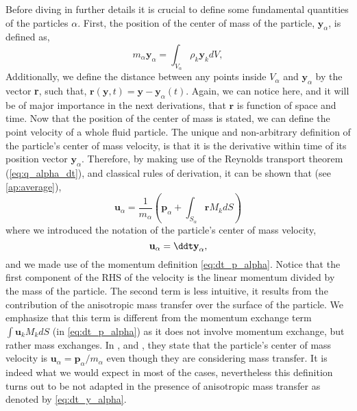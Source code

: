 Before diving in further details it is crucial to define some fundamental quantities of the particles $\alpha$. 
First, the position of the center of mass of the particle, $\textbf{y}_\alpha$, is defined as, 
\begin{equation*}
    m_\alpha \textbf{y}_\alpha
    = \int_{V_\alpha} \rho_k \textbf{y}_k dV,
\end{equation*}
Additionally, we define the distance between any points inside $V_\alpha$ and $\textbf{y}_\alpha$ by the vector \textbf{r}, such that, $\textbf{r}(\textbf{y},t) = \textbf{y} - \textbf{y}_\alpha(t)$.
Again, we can notice here, and it will be of major importance in the next derivations, that $\textbf{r}$ is function of space and time. 
Now that the position of the center of mass is stated, we can define the point velocity of a whole fluid particle.
The unique and non-arbitrary definition of the particle's center of mass velocity, is that it is the derivative within time of its position vector $\textbf{y}_\alpha$.
Therefore, by making use of the Reynolds transport theorem (\ref{eq:q_alpha_dt}), and classical rules of derivation, it can be shown that (see \ref{ap:average}),  
\begin{equation}
    \textbf{u}_\alpha
    = \frac{1}{m_\alpha} \left(
        \textbf{p}_\alpha
        +  \int_{S_\alpha} \textbf{r} M_k dS
    \right)
    \label{eq:dt_y_alpha}
\end{equation}
where we introduced the notation of the particle's center of mass velocity, 
\begin{equation*}
    \textbf{u}_\alpha = \ddt \textbf{y}_\alpha,
\end{equation*}
and we made use of the momentum definition \ref{eq:dt_p_alpha}.
Notice that the first component of the RHS of the velocity is the linear momentum divided by the mass of the particle.
The second term is less intuitive, it results from the contribution of the anisotropic mass transfer over the surface of the particle. 
We emphasize that this term is different from the momentum exchange term $\int \textbf{u}_kM_k dS$ (in \ref{eq:dt_p_alpha}) as it does not involve momentum exchange, but rather mass exchanges. 
In \citet{zaepffel2011modelisation}, \citet{paisant2014modelisation} and \citet{morel2015mathematical}, they state that the particle's center of mass velocity is $\textbf{u}_\alpha = \textbf{p}_\alpha / m_\alpha$ even though they are considering mass transfer. 
It is indeed what we would expect in most of the cases, nevertheless this definition turns out to be not adapted in the presence of anisotropic mass transfer as denoted by \ref{eq:dt_y_alpha}. 
